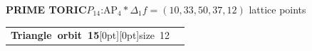 \documentclass[14pt]{extarticle}
\makeatletter
\newcommand{\AtlasSupportOrbitSplit}[2]{%
  \begin{tabularx}{\linewidth}[t]{%
    @{}>{\raggedright\arraybackslash}p{.37\linewidth}%
    @{\hspace{2.5mm}\AtlasOrbitDivider\hspace{2.5mm}}%
    >{\raggedright\arraybackslash}X@{}}%
    \begin{minipage}[t]{\linewidth}\vspace{0pt}#1\end{minipage} &
    \begin{minipage}[t]{\linewidth}\vspace{0pt}#2\end{minipage}
  \end{tabularx}}
\makeatother
\begin{document}
\begin{atlasbox}\begin{atlaspanel}
\textcolor{toricgreen}{\bfseries PRIME TORIC}\quad \(P_{14}\):\enspace \(\mathrm{AP}_{4}\ast\Delta_{1}\)\quad \(f=(10,33,50,37,12)\) lattice points
\end{atlaspanel}\end{atlasbox}
\clearpage
\begin{atlaspanel}[top=1mm,bottom=2mm]
\AtlasSupportOrbitSplit{%
\vspace*{-3mm}\mbox{{\LARGE\bfseries Triangle orbit 15}\hspace{3mm}\raisebox{.8mm}[0pt][0pt]{{\fontsize{16}{18}\selectfont\color{muted}size 12}}}%
}{%
\vspace*{-3mm}{\fontsize{13}{16}\selectfont{\color{muted}\(\mathbb{Q}\) and \(\mathbb{F}_2\)}\quad{\color{muted}\(\underline{\{1,\,3,\,9\}}\), \(\{4,\,5,\,10\}\), \(\{3,\,9,\,23\}\), \(\{5,\,10,\,24\}\), \(\{16,\,30,\,38\}\), \(\{16,\,30,\,39\}\), \(\{27,\,30,\,48\}\), \(\{27,\,30,\,49\}\), \(\{10,\,42,\,46\}\), \(\{9,\,43,\,47\}\), \(\{10,\,46,\,51\}\), \(\{9,\,47,\,50\}\)}\rule[-3mm]{0pt}{3mm}}%
}%
\end{atlaspanel}\vspace{2mm}
\end{document}
